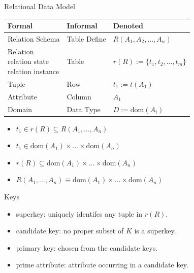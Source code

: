 \documentclass[a4paper]{article}
\begin{document}
\begin{multicols}{3}

\begin{cheatsheetblock}{Relational Data Model}
    \begin{tabularx}{\linewidth}{|X|X|X|}
        \hline
        \textbf{Formal} & \textbf{Informal} & \textbf{Denoted}                             \\
        \hline
        Relation Schema & Table Define      & $R(A_1, A_2,\allowbreak\dots, A_n)$          \\
        \hline
        \makecell[l]{Relation                                                              \\relation state\\relation instance}
                        & Table             & $r(R) := \{t_1, t_2\allowbreak,\dots, t_m\}$ \\
        \hline
        Tuple           & Row               & $t_1:=t(A_1)$                                \\
        \hline
        Attribute       & Column            & $A_1$                                        \\
        \hline
        Domain          & Data Type         & $D:=\mathrm{dom}(A_i)$                       \\
        \hline
    \end{tabularx}
    \begin{itemize}[topsep=0pt, noitemsep, ]
        \item $t_1 \in r(R) \subseteq R(A_1, \dots, A_n)$
        \item $t_1 \in \mathrm{dom}(A_1) \times \dots \times \mathrm{dom}(A_n)$
        \item $r(R) \subseteq \mathrm{dom}(A_1) \times \dots \times \mathrm{dom}(A_n)$
        \item $R(A_1, \dots, A_n) \equiv \mathrm{dom}(A_1) \times \dots \times \mathrm{dom}(A_n)$
    \end{itemize}
\end{cheatsheetblock}

\begin{cheatsheetblock}{Keys}
    \begin{itemize}
        \item superkey: uniquely identifes any tuple in $r(R)$.
        \item candidate key: no proper subset of $K$ is a superkey.
        \item primary key: chosen from the candidate keys.
        \item prime attribute: attribute occurring in a candidate key.
    \end{itemize}
\end{cheatsheetblock}


\end{multicols}
\end{document}
